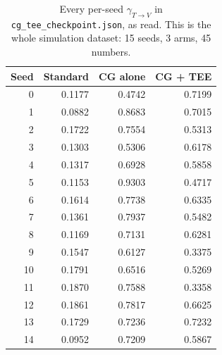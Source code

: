 \begin{table}[ht]\centering\small
\caption{Every per-seed $\gamma_{T\to V}$ in \texttt{cg\_tee\_checkpoint.json}, as read. This is the whole simulation dataset: 15 seeds, 3 arms, 45 numbers.}
\label{tab:seeddata}
\begin{tabular}{rrrr}\toprule
Seed & Standard & CG alone & CG + TEE \\ \midrule
0 & 0.1177 & 0.4742 & 0.7199 \\
1 & 0.0882 & 0.8683 & 0.7015 \\
2 & 0.1722 & 0.7554 & 0.5313 \\
3 & 0.1303 & 0.5306 & 0.6178 \\
4 & 0.1317 & 0.6928 & 0.5858 \\
5 & 0.1153 & 0.9303 & 0.4717 \\
6 & 0.1614 & 0.7738 & 0.6335 \\
7 & 0.1361 & 0.7937 & 0.5482 \\
8 & 0.1169 & 0.7131 & 0.6281 \\
9 & 0.1547 & 0.6127 & 0.3375 \\
10 & 0.1791 & 0.6516 & 0.5269 \\
11 & 0.1870 & 0.7588 & 0.3358 \\
12 & 0.1861 & 0.7817 & 0.6625 \\
13 & 0.1729 & 0.7236 & 0.7232 \\
14 & 0.0952 & 0.7209 & 0.5867 \\
\bottomrule\end{tabular}\end{table}

